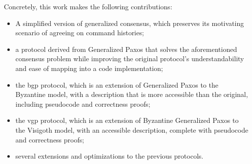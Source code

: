 Concretely, this work makes the following contributions:
\begin{itemize}
	\item A simplified version of generalized consensus, which preserves its motivating scenario of agreeing on command histories;
	\item a protocol derived from Generalized Paxos that solves the aforementioned consensus problem while improving the original protocol's understandability and ease of mapping into a code implementation;
	\item the \acrfull{bgp} protocol, which is an extension of Generalized Paxos to the Byzantine model, with a description that is more accessible than the original, including pseudocode and correctness proofs;
	\item the \acrfull{vgp} protocol, which is an extension of Byzantine Generalized Paxos to the Visigoth model, with an accessible description, complete with pseudocode and correctness proofs;
	\item several extensions and optimizations to the previous protocols.
\end{itemize}

